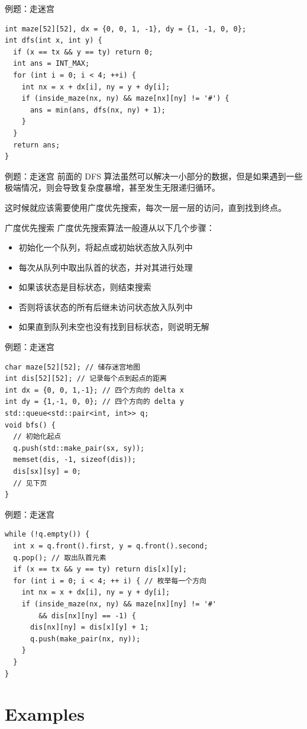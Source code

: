 \documentclass[12pt,aspectratio=169]{beamer}
\begin{document}
\begin{frame}[fragile]{例题：走迷宫}
  \begin{verbatim}
int maze[52][52], dx = {0, 0, 1, -1}, dy = {1, -1, 0, 0};
int dfs(int x, int y) {
  if (x == tx && y == ty) return 0;
  int ans = INT_MAX;
  for (int i = 0; i < 4; ++i) {
    int nx = x + dx[i], ny = y + dy[i];
    if (inside_maze(nx, ny) && maze[nx][ny] != '#') {
      ans = min(ans, dfs(nx, ny) + 1);
    }
  }
  return ans;
}
  \end{verbatim}
\end{frame}

\begin{frame}[fragile]{例题：走迷宫}
  前面的 DFS 算法虽然可以解决一小部分的数据，但是如果遇到一些极端情况，则会导致复杂度暴增，甚至发生无限递归循环。

  这时候就应该需要使用广度优先搜索，每次一层一层的访问，直到找到终点。
\end{frame}


\begin{frame}[fragile]{广度优先搜索}
  广度优先搜索算法一般遵从以下几个步骤：
  
  \begin{itemize}
    \item 初始化一个队列，将起点或初始状态放入队列中
    \item 每次从队列中取出队首的状态，并对其进行处理
    \item 如果该状态是目标状态，则结束搜索
    \item 否则将该状态的所有后继未访问状态放入队列中
    \item 如果直到队列未空也没有找到目标状态，则说明无解
  \end{itemize}
\end{frame}

\begin{frame}[fragile]{例题：走迷宫}
  \begin{verbatim}
char maze[52][52]; // 储存迷宫地图
int dis[52][52]; // 记录每个点到起点的距离
int dx = {0, 0, 1,-1}; // 四个方向的 delta x
int dy = {1,-1, 0, 0}; // 四个方向的 delta y
std::queue<std::pair<int, int>> q;
void bfs() {
  // 初始化起点
  q.push(std::make_pair(sx, sy));
  memset(dis, -1, sizeof(dis));
  dis[sx][sy] = 0;
  // 见下页
}
  \end{verbatim}
\end{frame}

\begin{frame}[fragile]{例题：走迷宫}
  \begin{verbatim}
while (!q.empty()) {
  int x = q.front().first, y = q.front().second;
  q.pop(); // 取出队首元素
  if (x == tx && y == ty) return dis[x][y];
  for (int i = 0; i < 4; ++ i) { // 枚举每一个方向
    int nx = x + dx[i], ny = y + dy[i];
    if (inside_maze(nx, ny) && maze[nx][ny] != '#'
        && dis[nx][ny] == -1) {
      dis[nx][ny] = dis[x][y] + 1;
      q.push(make_pair(nx, ny));
    }
  }
}
  \end{verbatim}
\end{frame}

\section[例题]{Examples}
\end{document}
